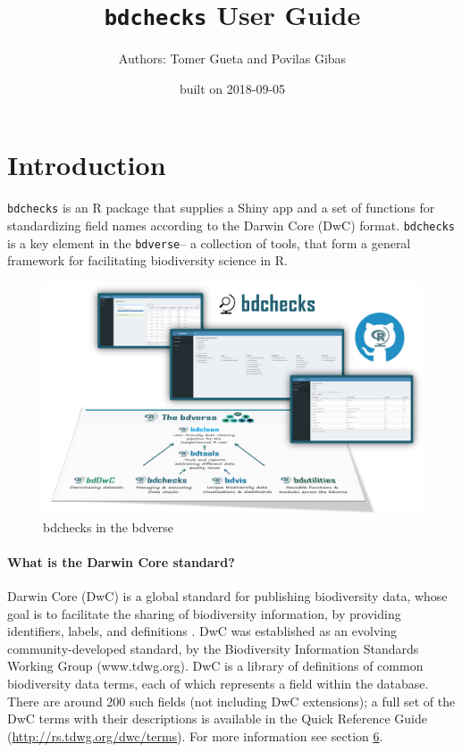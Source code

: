 \documentclass[]{book}
\title{\texttt{bdchecks} User Guide}
\author{Authors: Tomer Gueta and Povilas Gibas}
\date{built on 2018-09-05}
\theoremstyle{definition}
\theoremstyle{definition}
\theoremstyle{definition}
\theoremstyle{remark}
\begin{document}
\maketitle

{
\setcounter{tocdepth}{1}
\tableofcontents
}
\chapter*{Introduction}\label{introduction}

\texttt{bdchecks} is an R package that supplies a Shiny app and a set of
functions for standardizing field names according to the Darwin Core
(DwC) format. \texttt{bdchecks} is a key element in the
\texttt{bdverse}-- a collection of tools, that form a general framework
for facilitating biodiversity science in R.

\begin{figure}
\centering
\includegraphics{img/bdchecks_bdverse.png}
\caption{bdchecks in the bdverse}
\end{figure}

\subsubsection*{What is the Darwin Core
standard?}\label{what-is-the-darwin-core-standard}

Darwin Core (DwC) is a global standard for publishing biodiversity data,
whose goal is to facilitate the sharing of biodiversity information, by
providing identifiers, labels, and definitions \citep{DwC-paper}. DwC
was established as an evolving community-developed standard, by the
Biodiversity Information Standards Working Group (www.tdwg.org). DwC is
a library of definitions of common biodiversity data terms, each of
which represents a field within the database. There are around 200 such
fields (not including DwC extensions); a full set of the DwC terms with
their descriptions is available in the Quick Reference Guide
(\url{http://rs.tdwg.org/dwc/terms}). For more information see section
\protect\hyperlink{learn-more-about-darwin-core}{6}.
\end{document}
